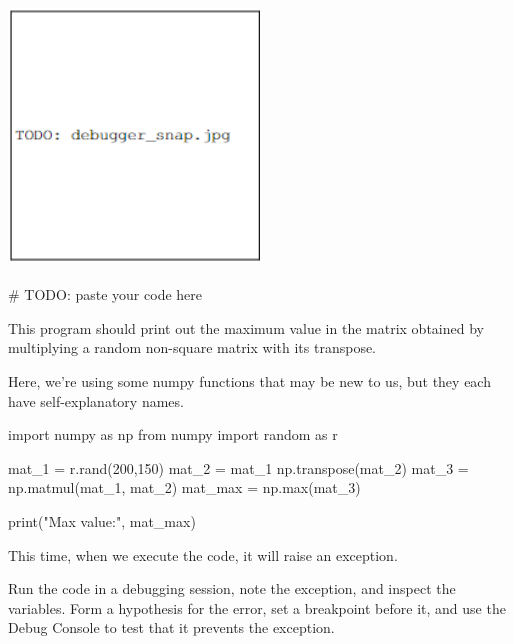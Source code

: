 \documentclass{csci1430}
\begin{document}
\begin{answer}[height=30]
    \includegraphics[width=0.5\textwidth,height=7cm,keepaspectratio]{images/TODO_debugger_snap.jpg}
    
    \begin{python}
    # TODO: paste your code here 
    \end{python}
\end{answer}


\pagebreak

\begin{question}[points=3,drawbox=false]
This program should print out the maximum value in the matrix obtained by multiplying a random non-square matrix with its transpose.

Here, we're using some numpy functions that may be new to us, but they each have self-explanatory names.

\begin{python}
import numpy as np
from numpy import random as r

mat_1 = r.rand(200,150)
mat_2 = mat_1
np.transpose(mat_2)
mat_3 = np.matmul(mat_1, mat_2)
mat_max = np.max(mat_3)

print("Max value:", mat_max)
\end{python}
\end{question}

This time, when we execute the code, it will raise an exception.

\begin{orangebox}
Run the code in a debugging session, note the exception, and inspect the variables. Form a hypothesis for the error, set a breakpoint before it, and use the Debug Console to test that it prevents the exception. 
\end{orangebox}
\end{document}
